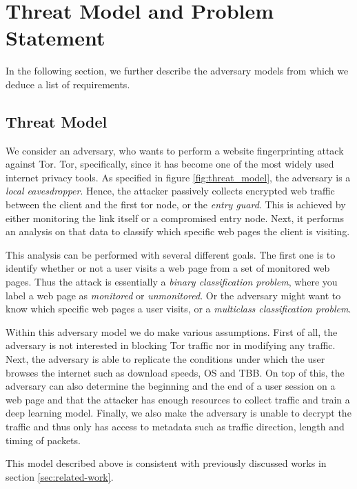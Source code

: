 \section{Threat Model and Problem Statement}

In the following section, we further describe the adversary models from which we deduce a list of requirements.

\subsection{Threat Model} \label{sec:threat-model}

We consider an adversary, who wants to perform a website fingerprinting attack against Tor.
Tor, specifically, since it has become one of the most widely used internet privacy tools.
As specified in figure \ref{fig:threat_model}, the adversary is a \textit{local eavesdropper}.
Hence, the attacker passively collects encrypted web traffic between the client and the first tor node, or the \textit{entry guard}.
This is achieved by either monitoring the link itself or a compromised entry node.
Next, it performs an analysis on that data to classify which specific web pages the client is visiting.

This analysis can be performed with several different goals.
The first one is to identify whether or not a user visits a web page from a set of monitored web pages.
Thus the attack is essentially a \textit{binary classification problem}, where you label a web page as \textit{monitored} or \textit{unmonitored}.
Or the adversary might want to know which specific web pages a user visits, or a \textit{multiclass classification problem}.

Within this adversary model we do make various assumptions.
First of all, the adversary is not interested in blocking Tor traffic nor in modifying any traffic.
Next, the adversary is able to replicate the conditions under which the user browses the internet such as download speeds, OS and TBB.
On top of this, the adversary can also determine the beginning and the end of a user session on a web page and that the attacker has enough resources to collect traffic and train a deep learning model.
Finally, we also make the adversary is unable to decrypt the traffic and thus only has access to metadata such as traffic direction, length and timing of packets.

This model described above is consistent with previously discussed works in section \ref{sec:related-work}.

